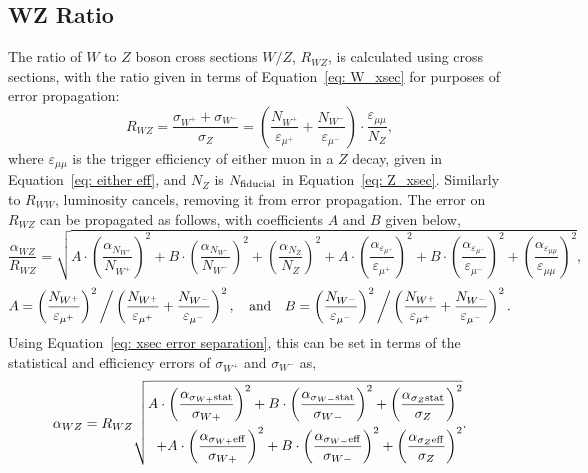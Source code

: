 \documentclass[a4paper]{article}
\begin{document}
\subsection{WZ Ratio}
The ratio of $W$ to $Z$ boson cross sections $W/Z$, $R_{WZ}$, is calculated using cross sections, with the ratio given in terms of Equation~\ref{eq: W_xsec} for purposes of error propagation:
\begin{equation}
    R_{WZ} = \frac{\sigma_{W^+} + \sigma_{W^-}}{\sigma_{Z}} = \left( \frac{N_{W^+}}{\varepsilon_{\mu^+}} + \frac{N_{W^-}}{\varepsilon_{\mu^-}} \right) \cdot \frac{\varepsilon_{\mu\mu}}{N_{Z}},
\end{equation}
where $\varepsilon_{\mu\mu}$ is the trigger efficiency of either muon in a $Z$ decay, given in Equation~\ref{eq: either eff}, and $N_Z$ is $N_{\rm fiducial}$ in Equation~\ref{eq: Z_xsec}.
Similarly to $R_{WW}$, luminosity cancels, removing it from error propagation. The error on $R_{WZ}$ can be propagated as follows, with coefficients $A$ and $B$ given below,
\begin{equation}
        \frac{\alpha_{WZ}}{R_{WZ}} = \sqrt{
            A\cdot\left(\frac{\alpha_{N_{W^+}}}{N_{W^+}}\right)^2 + B\cdot\left(\frac{\alpha_{N_{W^-}}}{N_{W^-}}\right)^2 + \left(\frac{\alpha_{N_{Z}}}{N_{Z}}\right)^2 + A\cdot\left(\frac{\alpha_{\varepsilon_{\mu^+}}}{\varepsilon_{\mu^+}}\right)^2 + B\cdot\left(\frac{\alpha_{\varepsilon_{\mu^-}}}{\varepsilon_{\mu^-}}\right)^2 + \left(\frac{\alpha_{\varepsilon_{\mu\mu}}}{\varepsilon_{\mu\mu}}\right)^2
        },
\end{equation}
\begin{equation}
    A = \left(\frac{N_{W^+}}{\varepsilon_{\mu^+}}\right)^2 \bigg/ \left(\frac{N_{W^+}}{\varepsilon_{\mu^+}} + \frac{N_{W^-}}{\varepsilon_{\mu^-}}\right)^2, \quad {\rm and} \quad B = \left(\frac{N_{W^-}}{\varepsilon_{\mu^-}}\right)^2 \bigg/ \left(\frac{N_{W^+}}{\varepsilon_{\mu^+}} + \frac{N_{W^-}}{\varepsilon_{\mu^-}}\right)^2.
\end{equation}
Using Equation~\ref{eq: xsec error separation}, this can be set in terms of the statistical and efficiency errors of $\sigma_{W^+}$ and $\sigma_{W^-}$ as,
\begin{equation}
        \alpha_{WZ} = R_{WZ}\sqrt{
            \begin{aligned}
                A \cdot \left(\frac{\alpha_{\sigma_{W+} \rm stat}}{\sigma_{W+}}\right)^2 + B \cdot \left(\frac{\alpha_{\sigma_{W-}\rm stat}}{\sigma_{W-}}\right)^2 + \left(\frac{\alpha_{\sigma_{Z}\rm stat}}{\sigma_Z}\right)^2 \\
                + A \cdot \left(\frac{\alpha_{\sigma_{W+} \rm eff}}{\sigma_{W+}}\right)^2 + B \cdot \left(\frac{\alpha_{\sigma_{W-}\rm eff}}{\sigma_{W-}}\right)^2 + \left(\frac{\alpha_{\sigma_{Z}\rm eff}}{\sigma_Z}\right)^2 \\
            \end{aligned}
        }.
        \label{eq: WZ errors}
\end{equation}
\end{document}

